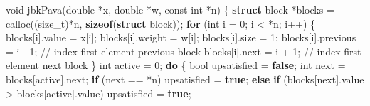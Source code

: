 \documentclass[
  12pt,
  letterpaper,
  DIV=11,
  numbers=noendperiod]{scrreprt}
\newenvironment{Shaded}{\begin{snugshade}}{\end{snugshade}}
\newcommand{\CommentTok}[1]{\textcolor[rgb]{0.37,0.37,0.37}{#1}}
\newcommand{\ControlFlowTok}[1]{\textcolor[rgb]{0.00,0.23,0.31}{\textbf{#1}}}
\newcommand{\DataTypeTok}[1]{\textcolor[rgb]{0.68,0.00,0.00}{#1}}
\newcommand{\DecValTok}[1]{\textcolor[rgb]{0.68,0.00,0.00}{#1}}
\newcommand{\KeywordTok}[1]{\textcolor[rgb]{0.00,0.23,0.31}{\textbf{#1}}}
\newcommand{\NormalTok}[1]{\textcolor[rgb]{0.00,0.23,0.31}{#1}}
\newcommand{\OperatorTok}[1]{\textcolor[rgb]{0.37,0.37,0.37}{#1}}
\theoremstyle{remark}
\begin{document}
\begin{Shaded}
\begin{Highlighting}[]
\DataTypeTok{void}\NormalTok{ jbkPava}\OperatorTok{(}\DataTypeTok{double} \OperatorTok{*}\NormalTok{x}\OperatorTok{,} \DataTypeTok{double} \OperatorTok{*}\NormalTok{w}\OperatorTok{,} \DataTypeTok{const} \DataTypeTok{int} \OperatorTok{*}\NormalTok{n}\OperatorTok{)} \OperatorTok{\{}
    \KeywordTok{struct}\NormalTok{ block }\OperatorTok{*}\NormalTok{blocks }\OperatorTok{=}\NormalTok{ calloc}\OperatorTok{((}\DataTypeTok{size\_t}\OperatorTok{)*}\NormalTok{n}\OperatorTok{,} \KeywordTok{sizeof}\OperatorTok{(}\KeywordTok{struct}\NormalTok{ block}\OperatorTok{));}
    \ControlFlowTok{for} \OperatorTok{(}\DataTypeTok{int}\NormalTok{ i }\OperatorTok{=} \DecValTok{0}\OperatorTok{;}\NormalTok{ i }\OperatorTok{\textless{}} \OperatorTok{*}\NormalTok{n}\OperatorTok{;}\NormalTok{ i}\OperatorTok{++)} \OperatorTok{\{}
\NormalTok{        blocks}\OperatorTok{[}\NormalTok{i}\OperatorTok{].}\NormalTok{value }\OperatorTok{=}\NormalTok{ x}\OperatorTok{[}\NormalTok{i}\OperatorTok{];}
\NormalTok{        blocks}\OperatorTok{[}\NormalTok{i}\OperatorTok{].}\NormalTok{weight }\OperatorTok{=}\NormalTok{ w}\OperatorTok{[}\NormalTok{i}\OperatorTok{];}
\NormalTok{        blocks}\OperatorTok{[}\NormalTok{i}\OperatorTok{].}\NormalTok{size }\OperatorTok{=} \DecValTok{1}\OperatorTok{;}
\NormalTok{        blocks}\OperatorTok{[}\NormalTok{i}\OperatorTok{].}\NormalTok{previous }\OperatorTok{=}\NormalTok{ i }\OperatorTok{{-}} \DecValTok{1}\OperatorTok{;}  \CommentTok{// index first element previous block}
\NormalTok{        blocks}\OperatorTok{[}\NormalTok{i}\OperatorTok{].}\NormalTok{next }\OperatorTok{=}\NormalTok{ i }\OperatorTok{+} \DecValTok{1}\OperatorTok{;}      \CommentTok{// index first element next block}
    \OperatorTok{\}}
    \DataTypeTok{int}\NormalTok{ active }\OperatorTok{=} \DecValTok{0}\OperatorTok{;}
    \ControlFlowTok{do} \OperatorTok{\{}
        \DataTypeTok{bool}\NormalTok{ upsatisfied }\OperatorTok{=} \KeywordTok{false}\OperatorTok{;}
        \DataTypeTok{int}\NormalTok{ next }\OperatorTok{=}\NormalTok{ blocks}\OperatorTok{[}\NormalTok{active}\OperatorTok{].}\NormalTok{next}\OperatorTok{;}
        \ControlFlowTok{if} \OperatorTok{(}\NormalTok{next }\OperatorTok{==} \OperatorTok{*}\NormalTok{n}\OperatorTok{)}
\NormalTok{            upsatisfied }\OperatorTok{=} \KeywordTok{true}\OperatorTok{;}
        \ControlFlowTok{else} \ControlFlowTok{if} \OperatorTok{(}\NormalTok{blocks}\OperatorTok{[}\NormalTok{next}\OperatorTok{].}\NormalTok{value }\OperatorTok{\textgreater{}}\NormalTok{ blocks}\OperatorTok{[}\NormalTok{active}\OperatorTok{].}\NormalTok{value}\OperatorTok{)}
\NormalTok{            upsatisfied }\OperatorTok{=} \KeywordTok{true}\OperatorTok{;}

\end{Highlighting}
\end{Shaded}
\end{document}
